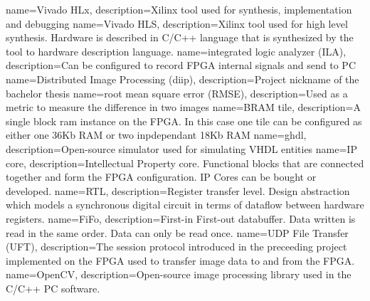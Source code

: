 %
%
{
    name=Vivado HLx,
    description={Xilinx tool used for synthesis, implementation and debugging}
}
{
    name=Vivado HLS,
    description={Xilinx tool used for high level synthesis. Hardware is
    described in C/C++ language that is synthesized by the tool to hardware
    description language.}
}
{
    name=integrated logic analyzer (ILA),
    description={Can be configured to record FPGA internal signals and send to PC}
}
{
    name=Distributed Image Processing (diip),
    description={Project nickname of the bachelor thesis}
}
{
    name=root mean square error (RMSE),
    description={Used as a metric to measure the difference in two images}
}
{
    name=BRAM tile,
    description={A single block ram instance on the FPGA. In this case one tile
    can be configured as either one 36Kb RAM or two inpdependant 18Kb RAM}
}
{
    name=ghdl,
    description={Open-source simulator used for simulating VHDL entities}
}
{
    name=IP core,
    description={Intellectual Property core. Functional blocks that are
    connected together and form the FPGA configuration. IP Cores can be bought
    or developed.}
}
{
    name=RTL,
    description={Register transfer level. Design abstraction which models a
    synchronous digital circuit in terms of dataflow between hardware
    registers.}
}
{
    name=FiFo,
    description={First-in First-out databuffer. Data written is read in the
    same order. Data can only be read once.}
}
{
    name=UDP File Transfer (UFT),
    description={The session protocol introduced in the preceeding project
    implemented on
    the FPGA used to transfer image data to and from the FPGA.}
}
{
    name=OpenCV,
    description={Open-source image processing library used in the C/C++ PC
    software.}
}